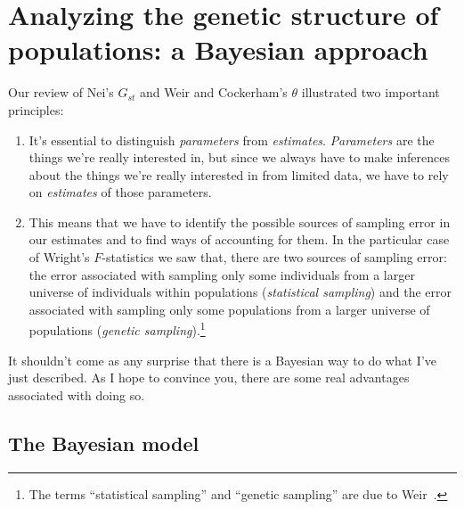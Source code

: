\chapter{Analyzing the genetic structure of populations: a Bayesian approach}

Our review of Nei's $G_{st}$ and Weir and Cockerham's $\theta$
illustrated two important principles:

\begin{enumerate}

\item It's essential to distinguish {\it parameters} from {\it
  estimates}. {\it Parameters} are the things we're really interested
  in, but since we always have to make inferences about the things
  we're really interested in from limited data, we have to rely on
  {\it estimates} of those parameters.

\item This means that we have to identify the possible sources of
  sampling error in our estimates and to find ways of accounting for
  them. In the particular case of Wright's $F$-statistics we saw that,
  there are two sources of sampling error: the error associated with
  sampling only some individuals from a larger universe of individuals
  within populations ({\it statistical sampling\/}) and the error
  associated with sampling only some populations from a larger
  universe of populations ({\it genetic sampling\/}).\footnote{The
  terms ``statistical sampling'' and ``genetic sampling'' are due to
  Weir~\cite{Weir-1996}.}

\end{enumerate}

\noindent It shouldn't come as any surprise that there is a Bayesian
way to do what I've just described. As I hope to convince you, there
are some real advantages associated with doing so.

\section*{The Bayesian model}


